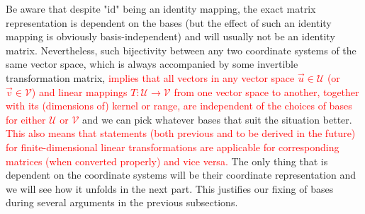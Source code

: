 Be aware that despite "$\text{id}$" being an identity mapping, the exact matrix representation is dependent on the bases (but the effect of such an identity mapping is obviously basis-independent) and will usually not be an identity matrix. Nevertheless, such bijectivity between any two coordinate systems of the same vector space, which is always accompanied by some invertible transformation matrix, \textcolor{red}{implies that all vectors in any vector space $\vec{u} \in \mathcal{U}$ (or $\vec{v} \in \mathcal{V}$) and linear mappings $T: \mathcal{U} \to \mathcal{V}$ from one vector space to another, together with its (dimensions of) kernel or range, are independent of the choices of bases for either $\mathcal{U}$ or $\mathcal{V}$} and we can pick whatever bases that suit the situation better. \textcolor{red}{This also means that statements (both previous and to be derived in the future) for finite-dimensional linear transformations are applicable for corresponding matrices (when converted properly) and vice versa.} The only thing that is dependent on the coordinate systems will be their coordinate representation and we will see how it unfolds in the next part. This justifies our fixing of bases during several arguments in the previous subsections.

